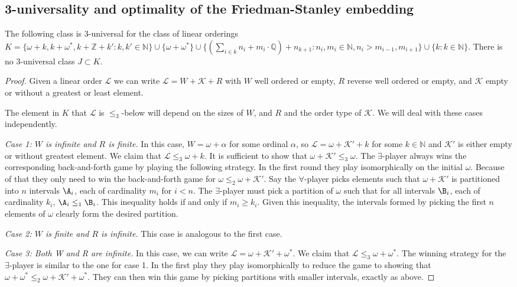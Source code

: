 \documentclass{amsart}
\newcommand{\Q}{\mathbb{Q}}
\newcommand{\Z}{\mathbb{Z}}
\newcommand{\K}{\mathcal{K}}
\renewcommand{\L}{\mathcal{L}}
\begin{document}
\subsection{3-universality and optimality of the Friedman-Stanley embedding}
\begin{theorem}\label{thm:3universal}
The following class is $3$-universal for the class of linear orderings
$K=\{\omega+k, k+\omega^*, k+\Z+k':k,k'\in\mathbb N\}\cup\{\omega+\omega^*\}\cup
\{(\sum_{i\in k} n_i + m_i\cdot\Q )+n_{k+1}:n_i,m_i\in\mathbb N,
n_i>m_{i-1},m_{i+1}\}\cup\{k:k\in\mathbb N\}$. There is no $3$-universal class
$J\subset K$.
\end{theorem}
\begin{proof}
Given a linear order $\L$ we can write $\L=W+\K+R$ with $W$ well ordered or
empty, $R$ reverse well ordered or empty, and $\K$ empty or without a greatest or least element.

The element in $K$ that $\L$ is $\leq_3$-below will depend on the sizes
of $W$, and $R$ and the order type of $\K$. We will deal with these cases
independently.

\emph{Case 1: $W$ is infinite and $R$ is finite.}
In this case, $W=\omega+\alpha$ for some ordinal $\alpha$, so $\L=\omega+\K'+k$
for some $k\in \mathbb{N}$ and $\K'$ is either empty or without greatest element.
We claim that $\L\leq_3\omega+k$.
It is sufficient to show that $\omega+\K'\leq_3\omega$.
The $\exists$-player always wins the corresponding back-and-forth game by
playing the following strategy. In the first round they play isomorphically on
the initial $\omega$. Because of that they only need to win the back-and-forth game for $\omega\leq_2 \omega+\K'$. Say the $\forall$-player picks elements such that
$\omega+\K'$ is partitioned into $n$ intervals $\A_i$, each of cardinality $m_i$ for
$i<n$. The $\exists$-player must pick a partition of $\omega$ such that for all intervals $\B_i$, each of
cardinality $k_i$, $\A_i\leq_1 \B_i$. This inequality holds if and only if
$m_i\geq k_i$. Given this inequality, the intervals formed by picking the first $n$ elements of  $\omega$ 
clearly form the desired partition.

\emph{Case 2: $W$ is finite and $R$ is infinite.} This case is analogous to the
first case.

\emph{Case 3: Both W and R are infinite.}
In this case, we can write $\L=\omega+\K'+\omega^*$.
We claim that $\L\leq_3 \omega+\omega^*$. The winning strategy for the
$\exists$-player is similar to the one for case 1. In the first play they play
isomorphically to reduce the game to showing that $\omega+\omega^*\leq_2
\omega+\K'+\omega^*$. They can then win this game by picking partitions with
smaller intervals, exactly as above.


\end{proof}
\end{document}
